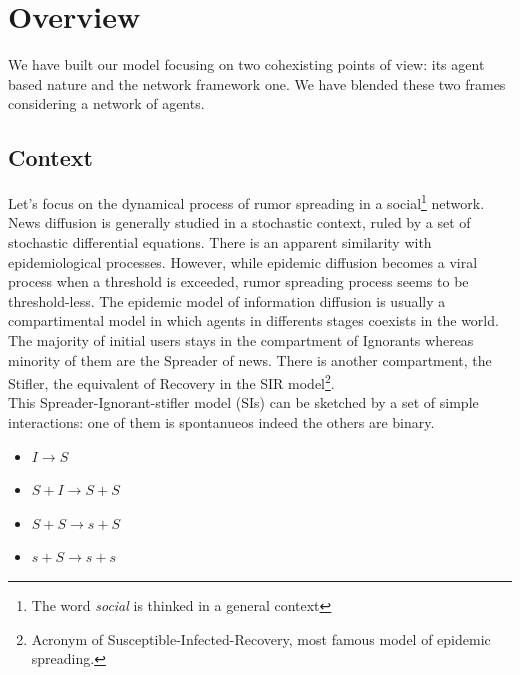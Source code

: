 \documentclass[11pt]{article} %
\begin{document}
\section{Overview}
We have built our model focusing on two cohexisting points of view: its agent based nature and the network framework one. 
We have blended these two frames considering a network of agents. 
\subsection{Context}
Let's focus on the dynamical process of rumor spreading in a social\footnote{The word \textit{ social} is thinked in a general context} network.
 News diffusion is generally studied in a stochastic context, ruled by a set of stochastic differential equations.
 There is an apparent similarity with  epidemiological processes. 
However, while epidemic diffusion becomes a viral process when a threshold is exceeded, rumor spreading process seems to be threshold-less.
 The epidemic model of information diffusion is usually a compartimental model in which agents in differents stages coexists in the world.
The majority of initial users stays in the compartment of Ignorants whereas minority of them are the Spreader of news.
 There is another compartment, the Stifler, the equivalent of Recovery in the SIR model\footnote{Acronym of Susceptible-Infected-Recovery, most famous model of epidemic spreading.}. 
\\ This Spreader-Ignorant-stifler model (SIs) can be sketched by a set of simple interactions: one of them is spontanueos indeed the others are binary.
\begin{itemize}
\item$ I \longrightarrow S$
\item $S+I \longrightarrow S + S$

\item $S + S \longrightarrow s + S$

\item $s + S \longrightarrow  s + s$
\end{itemize}
\end{document}
